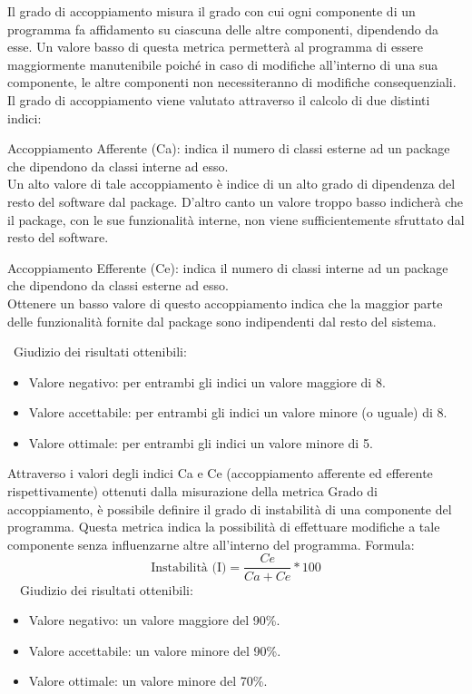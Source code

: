 \documentclass[a4paper, titlepage]{article}
\begin{document}
Il grado di accoppiamento misura il grado con cui ogni componente di un programma fa affidamento su ciascuna delle altre componenti, dipendendo da esse.
Un valore basso di questa metrica permetterà al programma di essere maggiormente manutenibile poiché in caso di modifiche all'interno di una sua componente, le altre componenti non necessiteranno di modifiche consequenziali.
\\ Il grado di accoppiamento viene valutato attraverso il calcolo di due distinti indici:
\begin{description}
\item{ Accoppiamento Afferente (Ca):} indica il numero di classi esterne ad un package che dipendono da classi interne ad esso. 
\\ Un alto valore di tale accoppiamento è indice di un alto grado di dipendenza del resto del software dal package. D'altro canto un valore troppo basso indicherà che il package, con le sue funzionalità interne, non viene sufficientemente sfruttato dal resto del software.
\item{Accoppiamento Efferente (Ce):} indica il numero di classi interne ad un package che dipendono da classi esterne ad esso. 
\\Ottenere un basso valore di questo accoppiamento indica che la maggior parte delle funzionalità fornite dal package sono indipendenti dal resto del sistema.
\end{description}
\
\newline Giudizio dei risultati ottenibili:
\begin{itemize}
\item Valore negativo: per entrambi gli indici un valore maggiore di 8.   
\item Valore accettabile: per entrambi gli indici un valore minore (o uguale) di 8.
\item Valore ottimale: per entrambi gli indici un valore minore di 5.
\end{itemize}

Attraverso i valori degli indici Ca e Ce (accoppiamento afferente ed efferente rispettivamente) ottenuti dalla misurazione della metrica Grado di accoppiamento, è possibile definire il grado di instabilità di una componente del programma. Questa metrica indica la possibilità di effettuare modifiche a tale componente senza influenzarne altre all’interno del programma.
\newline Formula:
\begin{displaymath}
\mbox{Instabilità (I)}=\frac{Ce}{Ca+Ce}*100
\end{displaymath}
\
\
\newline Giudizio dei risultati ottenibili:
\begin{itemize}
\item Valore negativo: un valore maggiore del 90\%.
\item Valore accettabile: un valore minore del 90\%.
\item Valore ottimale: un valore minore del 70\%.
\end{itemize}
\end{document}

